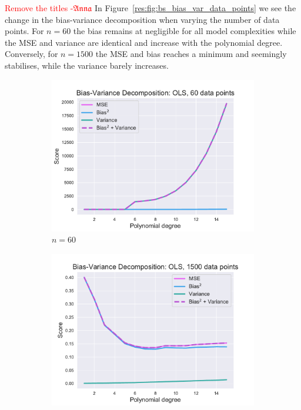 \documentclass[twocolumn,english,notitlepage]{article}
\newcommand{\comment}[1]{\textcolor{red}{#1}}
\newcommand{\Anna}{$\mathfrak{Anna}$}
\begin{document}
            \comment{Remove the titles -\Anna}
            In Figure~\ref{res:fig:bs_bias_var_data_points} we see the change in the bias-variance decomposition when varying the number of data points. For $n=60$ the bias remains at negligible for all model complexities while the MSE and variance are identical and increase with the polynomial degree. Conversely, for $n=1500$ the MSE and bias reaches a minimum and seemingly stabilises, while the variance barely increases. 
            \begin{figure}[ht]
                \begin{subfigure}{.5\textwidth}
                    \centering
                    \includegraphics[width=\linewidth]{BS_Bias_var_decomp_OLS_60_data_points.pdf}
                    \caption{$n=60$}
                    \end{subfigure}
                \begin{subfigure}{.5\textwidth}
                    \centering
                    \includegraphics[width=\linewidth]{BS_Bias_var_decomp_OLS_1500_data_points.pdf}

\end{subfigure}
\end{figure}
\end{document}
